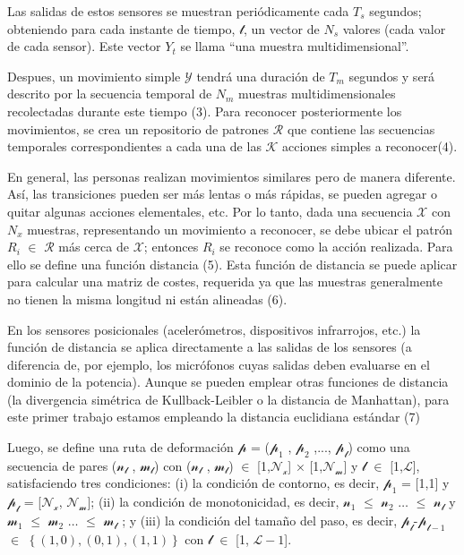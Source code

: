 \documentclass{article}
\begin{document}
Las salidas de estos sensores se muestran periódicamente cada $T_s$ segundos; obteniendo para cada instante de tiempo, $\mathscr{t}$, un vector de $N_s$ valores (cada valor de cada sensor). Este vector $Y_t$ se llama “una muestra multidimensional”. 

Despues, un movimiento simple $\mathscr{Y}$ tendrá una duración de $T_m$ segundos y será descrito por la secuencia temporal de $N_m$ muestras multidimensionales recolectadas durante este tiempo (3). Para reconocer posteriormente los movimientos, se crea un repositorio de patrones $\mathscr{R}$ que contiene las secuencias temporales correspondientes a cada una de las $\mathscr{K}$ acciones simples a reconocer(4).

En general, las personas realizan movimientos similares pero de manera diferente. Así, las transiciones pueden ser más lentas o más rápidas, se pueden agregar o quitar algunas acciones elementales, etc. Por lo tanto, dada una secuencia $\mathscr{X}$ con $N_x$  muestras, representando un movimiento a reconocer, se debe ubicar el patrón $R_i$  $\in$  $\mathscr{R}$ más cerca de $\mathscr{X}$; entonces $R_i$ se reconoce como la acción realizada. Para ello se define una función distancia (5). Esta función de distancia se puede aplicar para calcular una matriz de costes, requerida ya que las muestras generalmente no tienen la misma longitud ni están alineadas (6).

En los sensores posicionales (acelerómetros, dispositivos infrarrojos, etc.) la función de distancia se aplica directamente a las salidas de los sensores (a diferencia de, por ejemplo, los micrófonos cuyas salidas deben evaluarse en el dominio de la potencia). Aunque se pueden emplear otras funciones de distancia (la divergencia simétrica de Kullback-Leibler o la distancia de Manhattan), para este primer trabajo estamos empleando la distancia euclidiana estándar (7)

Luego, se define una ruta de deformación $\mathscr{p}$ = ($\mathscr{p_1}$ , $\mathscr{p_2}$ ,..., $\mathscr{p_l}$) como una secuencia de pares ($\mathscr{n_l}$ , $\mathscr{m_l}$) con ($\mathscr{n_l}$ , $\mathscr{m_l}$) $\in$ [1,$\mathscr{N_x}$] × [1,$\mathscr{N_m}$] y $\mathscr{l}$ $\in$ [1,$\mathscr{L}$], satisfaciendo tres condiciones: (i) la condición de contorno, es decir, $\mathscr{p_1}$ = [1,1] y $\mathscr{p_l}$ = [$\mathscr{N_x}$, $\mathscr{N_m}$]; (ii) la condición de monotonicidad, es decir, $\mathscr{n_1}$ $\leq$ $\mathscr{n_2}$ $\ldots$ $\leq$ $\mathscr{n_l}$ y $\mathscr{m_1}$ $\leq$ $\mathscr{m_2}$ $\ldots$ $\leq$ $\mathscr{m_l}$ ; y (iii) la condición del tamaño del paso, es decir, $\mathscr{p_l}$-$\mathscr{p_{l-1}}$ $\in$ $\left\lbrace(1,0), (0,1), (1,1)\right\rbrace$ con $\mathscr{l}$ $\in$ [1, $\mathscr{L-1}$].
\end{document}
